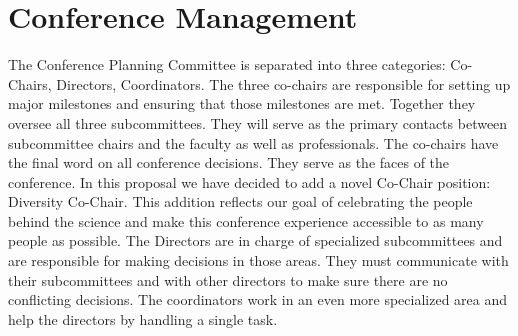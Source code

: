 \section{Conference Management}

The Conference Planning Committee is separated into three categories: Co-Chairs, Directors, Coordinators. The three co-chairs are responsible for setting up major milestones and ensuring that those milestones are met. Together they oversee all three subcommittees. They will serve as the primary contacts between subcommittee chairs and the faculty as well as professionals. The co-chairs have the final word on all conference decisions. They serve as the faces of the conference. In this proposal we have decided to add a novel Co-Chair position: Diversity Co-Chair. This addition reflects our goal of celebrating the people behind the science and make this conference experience accessible to as many people as possible. 
The Directors are in charge of specialized subcommittees and are responsible for making decisions in those areas. They must communicate with their subcommittees and with other directors to make sure there are no conflicting decisions. The coordinators work in an even more specialized area and help the directors by handling a single task.\\


